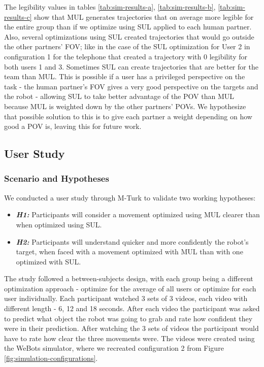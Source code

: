 \documentclass[letterpaper, 10 pt, conference]{ieeeconf}
\begin{document}
The legibility values in tables \ref{tab:sim-results-a}, \ref{tab:sim-results-b}, \ref{tab:sim-results-c} show that \ac{MUL} generates trajectories that on average more legible for the entire group than if we optimize using \ac{SUL} applied to each human partner. Also, several optimizations using \ac{SUL} created trajectories that would go outside the other partners' \ac{FOV}; like in the case of the \ac{SUL} optimization for User 2 in configuration 1 for the telephone that created a trajectory with 0 legibility for both users 1 and 3. Sometimes \ac{SUL} can create trajectories that are better for the team than \ac{MUL}. This is possible if a user has a privileged perspective on the task - the human partner's \ac{FOV} gives a very good perspective on the targets and the robot - allowing \ac{SUL} to take better advantage of the \ac{POV} than \ac{MUL} because \ac{MUL} is weighted down by the other partners' \ac{POV}s. We hypothesize that possible solution to this is to give each partner a weight depending on how good a \ac{POV} is, leaving this for future work.

\subsection{User Study}
\label{subsec:user-study}

\subsubsection{\textbf{Scenario and Hypotheses}}
We conducted a user study through \ac{M-Turk} to validate two working hypotheses:
\begin{itemize}
    \item \textbf{\emph{H1:}} Participants will consider a movement optimized using \ac{MUL} clearer than when optimized using \ac{SUL}.
    \item \textbf{\emph{H2:}} Participants will understand quicker and more confidently the robot's target, when faced with a movement optimized with \ac{MUL} than with one optimized with \ac{SUL}.
\end{itemize}

The study followed a between-subjects design, with each group being a different optimization approach - optimize for the average of all users or optimize for each user individually. Each participant watched 3 sets of 3 videos, each video with different length - 6, 12 and 18 seconds. After each video the participant was asked to predict what object the robot was going to grab and rate how confident they were in their prediction. After watching the 3 sets of videos the participant would have to rate how clear the three movements were. The videos were created using the WeBots simulator, where we recreated configuration 2 from Figure \ref{fig:simulation-configurations}.
\end{document}
